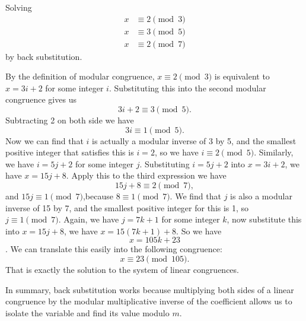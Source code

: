         \begin{example}
            Solving 
            \begin{align*}
                x &\equiv 2 \pmod{3} \\
                x &\equiv 3 \pmod{5} \\
                x &\equiv 2 \pmod{7}
                \end{align*}
            by back substitution.
        

        By the definition of modular congruence, $x\equiv 2 \pmod 3$ is equivalent to $x = 3i+2$ for some integer $i$.
        Substituting this into the second modular congruence gives us $$3i+2 \equiv 3 \pmod 5.$$
        Subtracting 2 on both side we have
        $$3i\equiv 1 \pmod 5.$$
        Now we can find that $i$ is actually a modular inverse of 3 by 5, and the smallest positive integer that
        satisfies this is $i=2$, so we have $i\equiv 2 \pmod 5$. Similarly, we have $i = 5j + 2$ for some integer
        $j$. Substituting $i = 5j + 2$ into $x = 3i+2$, we have $x = 15j + 8$. Apply this to the third 
        expression we have $$15j + 8\equiv 2 \pmod{7},$$ and $15j \equiv 1 \pmod 7$,because $8 \equiv 1\pmod 7$. We 
        find that $j$ is also a modular inverse of 15 by 7, and the smallest positive integer for this is 1, so 
        $j \equiv 1 \pmod 7$. Again, we have $j = 7k + 1$ for some integer $k$, now substitute this into 
        $x = 15j + 8$, we have $x = 15(7k + 1) + 8$. So we have $$x = 105k + 23$$.
        We can translate this easily into the following congruence:
        $$x \equiv 23 \pmod{105}.$$ That is exactly the solution to the system of linear congruences.
        \end{example}
        \begin{remark}
            In summary, back substitution works because multiplying both sides of a linear congruence by the modular multiplicative inverse of the coefficient allows us to isolate the variable and find its value modulo $m$.
        \end{remark}

                
        
